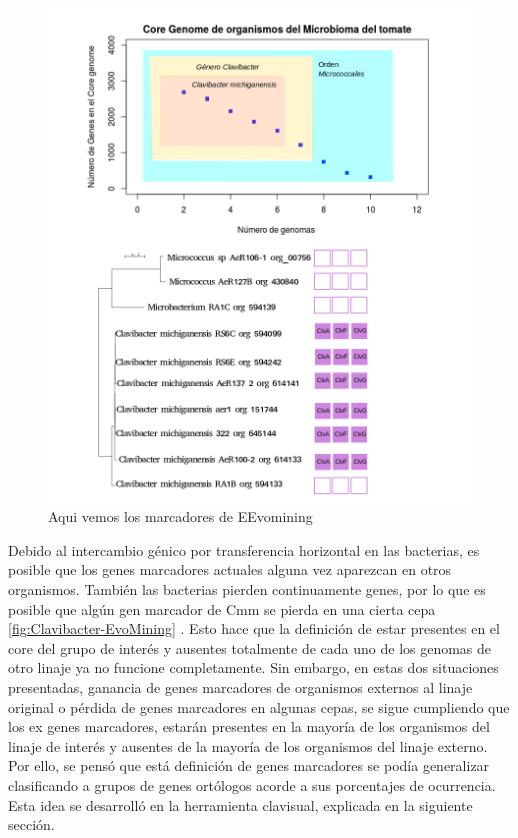 \documentclass[12pt,twoside]{reedthesis}
\begin{document}
  \begin{figure}[h!tbp]
  \centering
  \includegraphics[angle = 0,scale = .5]{chapter1/CoreGenomeMicrobioma.png}
  \caption[ X X Evomining]{\footnotesize{Aqui vemos los marcadores de EEvomining}}
  \label{fig:Clavibacter-EvoMining}
  \end{figure}
  
  Debido al intercambio génico por transferencia horizontal en las
  bacterias, es posible que los genes marcadores actuales alguna vez
  aparezcan en otros organismos. También las bacterias pierden
  continuamente genes, por lo que es posible que algún gen marcador de Cmm
  se pierda en una cierta cepa \autoref{fig:Clavibacter-EvoMining} . Esto
  hace que la definición de estar presentes en el core del grupo de
  interés y ausentes totalmente de cada uno de los genomas de otro linaje
  ya no funcione completamente. Sin embargo, en estas dos situaciones
  presentadas, ganancia de genes marcadores de organismos externos al
  linaje original o pérdida de genes marcadores en algunas cepas, se sigue
  cumpliendo que los ex genes marcadores, estarán presentes en la mayoría
  de los organismos del linaje de interés y ausentes de la mayoría de los
  organismos del linaje externo. Por ello, se pensó que está definición de
  genes marcadores se podía generalizar clasificando a grupos de genes
  ortólogos acorde a sus porcentajes de ocurrencia. Esta idea se
  desarrolló en la herramienta clavisual, explicada en la siguiente
  sección.
  
\end{document}
